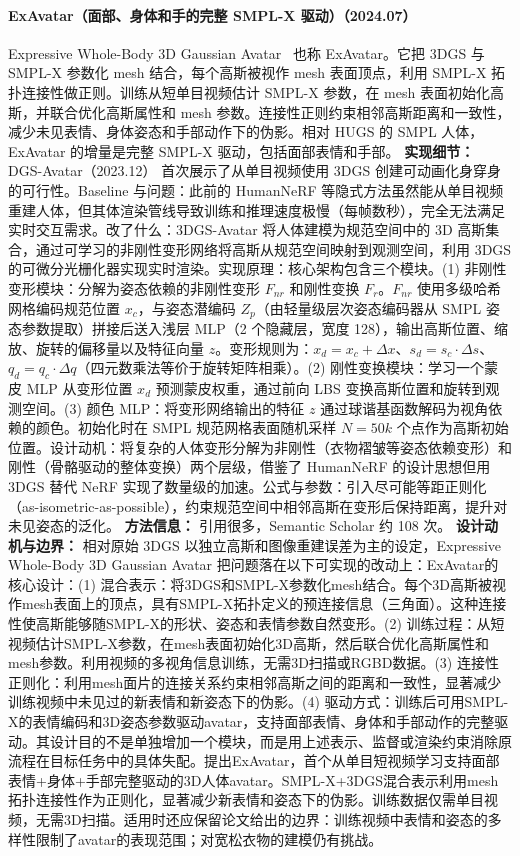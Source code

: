 \paragraph{ExAvatar（面部、身体和手的完整 SMPL-X 驱动）（2024.07）}
Expressive Whole-Body 3D Gaussian Avatar~\cite{2407_21686} 也称 ExAvatar。它把 3DGS 与 SMPL-X 参数化 mesh 结合，每个高斯被视作 mesh 表面顶点，利用 SMPL-X 拓扑连接性做正则。训练从短单目视频估计 SMPL-X 参数，在 mesh 表面初始化高斯，并联合优化高斯属性和 mesh 参数。连接性正则约束相邻高斯距离和一致性，减少未见表情、身体姿态和手部动作下的伪影。相对 HUGS 的 SMPL 人体，ExAvatar 的增量是完整 SMPL-X 驱动，包括面部表情和手部。
\textbf{实现细节：} DGS-Avatar（2023.12） 首次展示了从单目视频使用 3DGS 创建可动画化身穿身的可行性。Baseline 与问题：此前的 HumanNeRF 等隐式方法虽然能从单目视频重建人体，但其体渲染管线导致训练和推理速度极慢（每帧数秒），完全无法满足实时交互需求。改了什么：3DGS-Avatar 将人体建模为规范空间中的 3D 高斯集合，通过可学习的非刚性变形网络将高斯从规范空间映射到观测空间，利用 3DGS 的可微分光栅化器实现实时渲染。实现原理：核心架构包含三个模块。(1) 非刚性变形模块：分解为姿态依赖的非刚性变形 $F_{nr}$ 和刚性变换 $F_r$。$F_{nr}$ 使用多级哈希网格编码规范位置 $x_c$，与姿态潜编码 $Z_p$（由轻量级层次姿态编码器从 SMPL 姿态参数提取）拼接后送入浅层 MLP（2 个隐藏层，宽度 128），输出高斯位置、缩放、旋转的偏移量以及特征向量 $z$。变形规则为：$x_d = x_c + \Delta x$、$s_d = s_c \cdot \Delta s$、$q_d = q_c \cdot \Delta q$（四元数乘法等价于旋转矩阵相乘）。(2) 刚性变换模块：学习一个蒙皮 MLP 从变形位置 $x_d$ 预测蒙皮权重，通过前向 LBS 变换高斯位置和旋转到观测空间。(3) 颜色 MLP：将变形网络输出的特征 $z$ 通过球谐基函数解码为视角依赖的颜色。初始化时在 SMPL 规范网格表面随机采样 $N=50k$ 个点作为高斯初始位置。设计动机：将复杂的人体变形分解为非刚性（衣物褶皱等姿态依赖变形）和刚性（骨骼驱动的整体变换）两个层级，借鉴了 HumanNeRF 的设计思想但用 3DGS 替代 NeRF 实现了数量级的加速。公式与参数：引入尽可能等距正则化（as-isometric-as-possible），约束规范空间中相邻高斯在变形后保持距离，提升对未见姿态的泛化。
\textbf{方法信息：} 引用很多，Semantic Scholar 约 108 次。
\textbf{设计动机与边界：} 相对原始 3DGS 以独立高斯和图像重建误差为主的设定，Expressive Whole-Body 3D Gaussian Avatar 把问题落在以下可实现的改动上：ExAvatar的核心设计：(1) 混合表示：将3DGS和SMPL-X参数化mesh结合。每个3D高斯被视作mesh表面上的顶点，具有SMPL-X拓扑定义的预连接信息（三角面）。这种连接性使高斯能够随SMPL-X的形状、姿态和表情参数自然变形。(2) 训练过程：从短视频估计SMPL-X参数，在mesh表面初始化3D高斯，然后联合优化高斯属性和mesh参数。利用视频的多视角信息训练，无需3D扫描或RGBD数据。(3) 连接性正则化：利用mesh面片的连接关系约束相邻高斯之间的距离和一致性，显著减少训练视频中未见过的新表情和新姿态下的伪影。(4) 驱动方式：训练后可用SMPL-X的表情编码和3D姿态参数驱动avatar，支持面部表情、身体和手部动作的完整驱动。其设计目的不是单独增加一个模块，而是用上述表示、监督或渲染约束消除原流程在目标任务中的具体失配。提出ExAvatar，首个从单目短视频学习支持面部表情+身体+手部完整驱动的3D人体avatar。SMPL-X+3DGS混合表示利用mesh拓扑连接性作为正则化，显著减少新表情和姿态下的伪影。训练数据仅需单目视频，无需3D扫描。适用时还应保留论文给出的边界：训练视频中表情和姿态的多样性限制了avatar的表现范围；对宽松衣物的建模仍有挑战。

